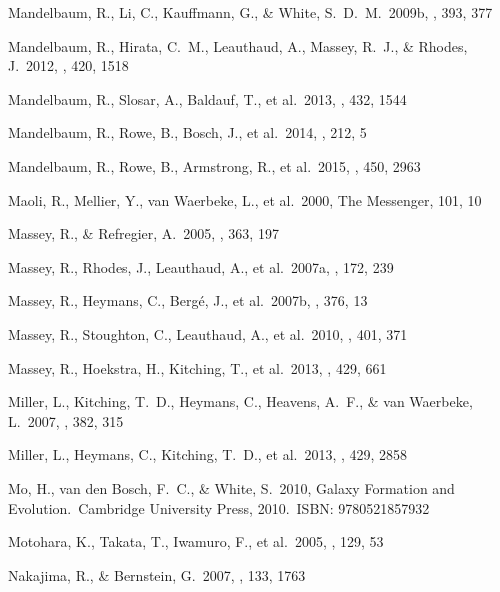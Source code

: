 \documentclass[apj]{emulateapj}
\begin{document}
\begin{thebibliography}{}
  Mandelbaum, R., Li,
  C., Kauffmann, G., \& White, S.~D.~M.\ 2009b, \mnras, 393, 377


  Mandelbaum, R.,
Hirata, C.~M., Leauthaud, A., Massey, R.~J.,
\& Rhodes, J.\ 2012, \mnras, 420, 1518

  Mandelbaum, R.,
  Slosar, A., Baldauf, T., et al.\ 2013, \mnras, 432, 1544

  Mandelbaum, R.,
  Rowe, B., Bosch, J., et al.\ 2014, \apjs, 212, 5

 Mandelbaum, R., 
Rowe, B., Armstrong, R., et al.\ 2015, \mnras, 450, 2963 


  Maoli, R., Mellier, Y.,
  van Waerbeke, L., et al.\ 2000, The Messenger, 101, 10

 Massey, R., \& Refregier, A.\ 2005, \mnras, 363, 197

  Massey, R., Rhodes, J.,
  Leauthaud, A., et al.\ 2007a, \apjs, 172, 239

 Massey, R., Heymans, C.,
Berg{\'e}, J., et al.\ 2007b, \mnras, 376, 13

 Massey, R., Stoughton,
C., Leauthaud, A., et al.\ 2010, \mnras, 401, 371

 Massey, R., Hoekstra,
H., Kitching, T., et al.\ 2013, \mnras, 429, 661

 Miller, L., Kitching,
T.~D., Heymans, C., Heavens, A.~F., \& van Waerbeke, L.\ 2007, \mnras, 382, 315

  Miller, L., Heymans, C.,
  Kitching, T.~D., et al.\ 2013, \mnras, 429, 2858

  Mo, H., van den Bosch, F.~C.,
   \& White, S.\ 2010, Galaxy Formation and Evolution.~Cambridge University
   Press, 2010.~ISBN: 9780521857932

  Motohara, K., Takata,
  T., Iwamuro, F., et al.\ 2005, \aj, 129, 53

   Nakajima, R., \& Bernstein, G.\ 2007, \aj, 133, 1763


\end{thebibliography}
\end{document}
